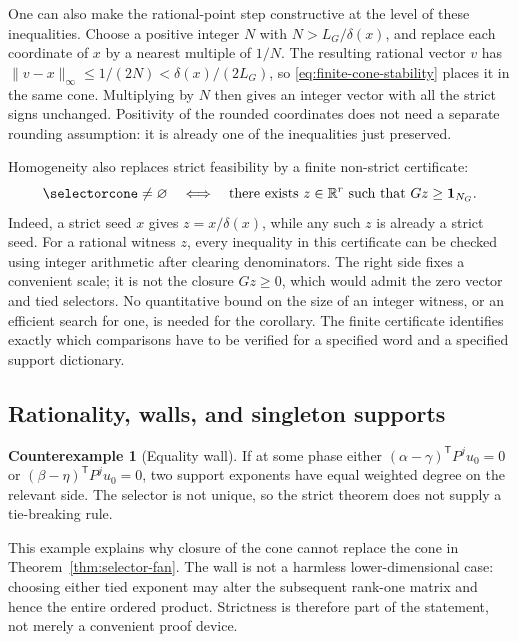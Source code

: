 \documentclass[11pt,letterpaper]{article}
\theoremstyle{definition}
\newtheorem{counterexample}[theorem]{Counterexample}
\theoremstyle{remark}
\numberwithin{equation}{section}
\begin{document}
One can also make the rational-point step constructive at the level of
these inequalities.  Choose a positive integer \(N\) with
\(N>L_G/\delta(x)\), and replace each coordinate of \(x\) by a nearest
multiple of \(1/N\).  The resulting rational vector \(v\) has
\(\|v-x\|_\infty\leq1/(2N)<\delta(x)/(2L_G)\), so
\eqref{eq:finite-cone-stability} places it in the same cone.  Multiplying by
\(N\) then gives an integer vector with all the strict signs unchanged.
Positivity of the rounded coordinates does not need a separate rounding
assumption: it is already one of the inequalities just preserved.

Homogeneity also replaces strict feasibility by a finite non-strict
certificate:
\begin{equation}
 \selectorcone\neq\varnothing
 \quad\Longleftrightarrow\quad
 \text{there exists }z\in\mathbb R^r
       \text{ such that }Gz\geq\mathbf1_{N_G}.
 \label{eq:finite-cone-certificate}
\end{equation}
Indeed, a strict seed \(x\) gives \(z=x/\delta(x)\), while any such \(z\)
is already a strict seed.  For a rational witness \(z\), every inequality
in this certificate can be checked using integer arithmetic after clearing
denominators.  The right side fixes a convenient scale; it is not the
closure \(Gz\geq0\), which would admit the zero vector and tied selectors.
No quantitative bound on the size of an integer witness, or an efficient
search for one, is needed for the corollary.  The finite certificate
identifies exactly which comparisons have to be verified for a specified
word and a specified support dictionary.

\subsection{Rationality, walls, and singleton supports}

\begin{counterexample}[Equality wall]
\label{cex:fan-wall}
If at some phase either
\((\alpha-\gamma)^{\mathsf T}P^ju_0=0\) or
\((\beta-\eta)^{\mathsf T}P^ju_0=0\), two support exponents have equal
weighted degree on the relevant side.  The selector is not unique, so the
strict theorem does not supply a tie-breaking rule.
\end{counterexample}

This example explains why closure of the cone cannot replace the cone in
Theorem~\ref{thm:selector-fan}.  The wall is not a harmless lower-dimensional
case: choosing either tied exponent may alter the subsequent rank-one
matrix and hence the entire ordered product.  Strictness is therefore part
of the statement, not merely a convenient proof device.
\end{document}
